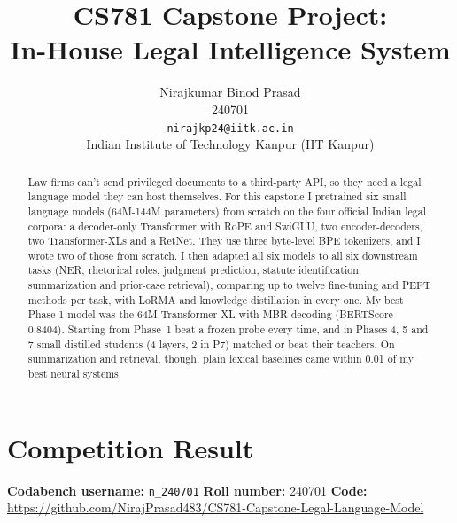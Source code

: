 \documentclass[11pt, oneside]{article}
\title{CS781 Capstone Project:\\
In-House Legal Intelligence System}
\author{
    Nirajkumar Binod Prasad \\
    240701 \\
    {\tt nirajkp24@iitk.ac.in}\\
    Indian Institute of Technology Kanpur (IIT Kanpur)
}
\date{}
\newcommand{\repo}{\url{https://github.com/NirajPrasad483/CS781-Capstone-Legal-Language-Model}}
\begin{document}
\maketitle
\vspace{-2.2em}
\begin{abstract}
Law firms can't send privileged documents to a third-party API, so they
need a legal language model they can host themselves. For this capstone I
pretrained six small language models (64M-144M parameters) from scratch on
the four official Indian legal corpora: a decoder-only Transformer with RoPE
and SwiGLU, two encoder-decoders, two Transformer-XLs and a RetNet. They use
three byte-level BPE tokenizers, and I wrote two of those from scratch. I then
adapted all six models to all six downstream tasks (NER, rhetorical roles,
judgment prediction, statute identification, summarization and prior-case
retrieval), comparing up to twelve fine-tuning and PEFT methods per task, with
LoRMA and knowledge distillation in every one. My best Phase-1 model was the
64M Transformer-XL with MBR decoding (BERTScore 0.8404). Starting from Phase~1
beat a frozen probe every time, and in Phases 4, 5 and 7 small distilled
students (4 layers, 2 in P7) matched or beat their teachers. On summarization
and retrieval, though, plain lexical baselines came within 0.01 of my best
neural systems.
\end{abstract}

\section{Competition Result}
\noindent
\textbf{Codabench username:} \texttt{n\_240701}
\hfill
\textbf{Roll number:} 240701
\hfill
\textbf{Code:} \repo
\end{document}
